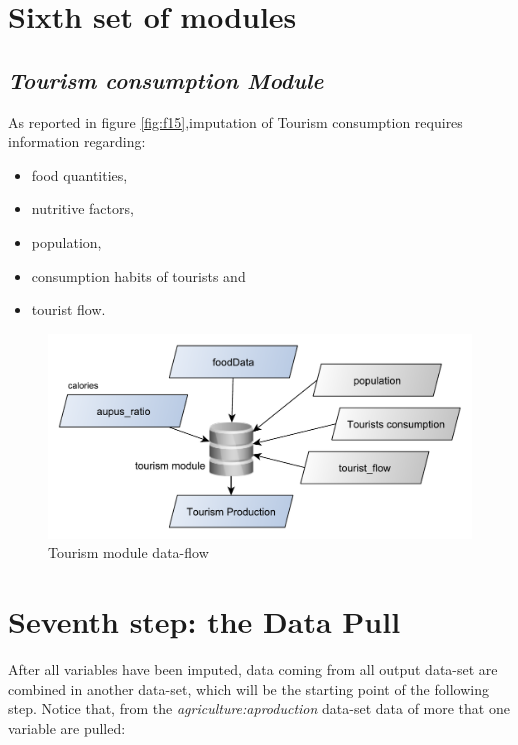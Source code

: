 \documentclass[]{article}
\providecommand{\tightlist}{%
  \setlength{\itemsep}{0pt}\setlength{\parskip}{0pt}}
\begin{document}
\section{Sixth set of modules}\label{sixth-set-of-modules}

\subsection{\texorpdfstring{\emph{Tourism consumption
Module}}{Tourism consumption Module}}\label{tourism-consumption-module}

As reported in figure \ref{fig:f15},imputation of Tourism consumption
requires information regarding:

\begin{itemize}
\tightlist
\item
  food quantities,
\item
  nutritive factors,
\item
  population,
\item
  consumption habits of tourists and
\item
  tourist flow.
\end{itemize}

\begin{figure}[H]

{\centering \includegraphics[width=0.6\linewidth]{images/SwsFbs/16_tourism} 

}

\caption{\label{fig:f16}Tourism module data-flow}\label{fig:f16}
\end{figure}

\section{Seventh step: the Data Pull}\label{seventh-step-the-data-pull}

After all variables have been imputed, data coming from all output
data-set are combined in another data-set, which will be the starting
point of the following step. Notice that, from the
\emph{agriculture:aproduction} data-set data of more that one variable
are pulled:
\end{document}
